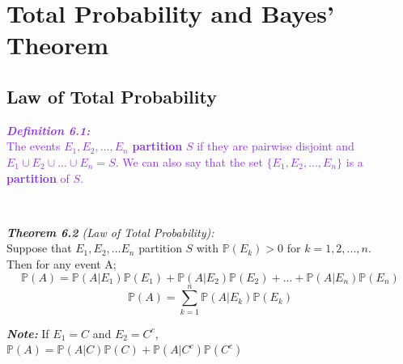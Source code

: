 \documentclass{report}
\newenvironment{cframed}[1][BlueViolet]
  {\begin{tcolorbox}[colframe=#1,colback=white]}
  {\end{tcolorbox}}
\newenvironment{cframed2}[1][PineGreen]
  {\begin{tcolorbox}[colframe=#1,colback=white]}
  {\end{tcolorbox}}
\begin{document}
\chapter{Total Probability and Bayes' Theorem}
\section{Law of Total Probability}

\begin{cframed}
\textcolor{BlueViolet}{\textit{\textbf{Definition 6.1:}}}\\
\textcolor{BlueViolet}{The events $E_1, E_2,...,E_n$ \textbf{partition} $S$ if they are pairwise disjoint and $E_1 \cup E_2 \cup ... \cup E_n = S$. We can also say that the set $ \{ E_1, E_2,...,E_n \}$ is a \textbf{partition} of $S$.}
\end{cframed}

\textcolor{White}{123}

\begin{cframed2}
\textcolor{PineGreen}{\textit{\textbf{Theorem 6.2} (Law of Total Probability):}}\\
\textcolor{PineGreen}{Suppose that $E_1,E_2,...E_n$ partition $S$ with $\mathbb{P}(E_k) > 0$ for $k = 1,2,...,n$.}\\
\textcolor{PineGreen}{Then for any event A;}
\textcolor{PineGreen}{\begin{equation}
    \mathbb{P}(A) = \mathbb{P}(A|E_1)\mathbb{P}(E_1) + \mathbb{P}(A|E_2)\mathbb{P}(E_2) + ... + \mathbb{P}(A|E_n)\mathbb{P}(E_n)
\end{equation}
\begin{equation}
    \mathbb{P}(A) = \sum_{k=1}^{n} \mathbb{P}(A|E_k)\mathbb{P}(E_k)
\end{equation}}
\end{cframed2}

\textit{\textbf{Note:}}
If $E_1 = C$ and $E_2 = C^c$,\\
$\mathbb{P}(A) = \mathbb{P}(A|C)\mathbb{P}(C) + \mathbb{P}(A|C^c)\mathbb{P}(C^c) $
\textcolor{White}{123}
\end{document}
